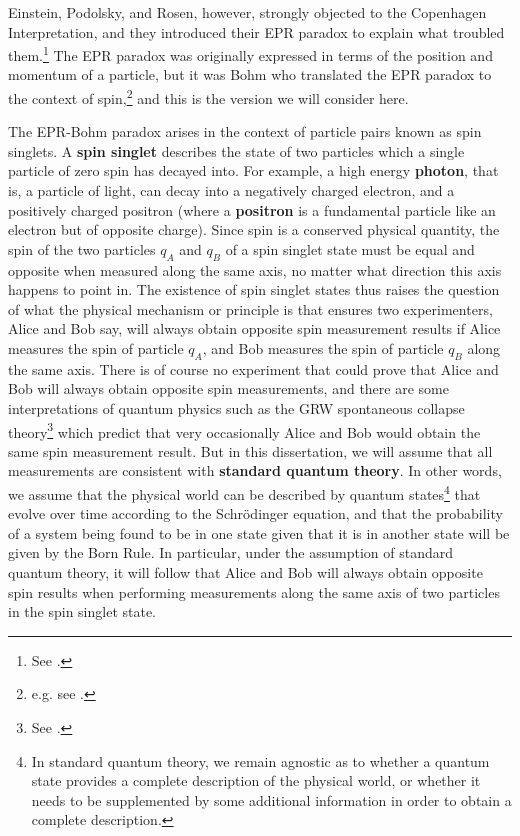 \documentclass[12pt]{report}
\begin{document}
Einstein, Podolsky, and Rosen, however, strongly objected to the Copenhagen Interpretation, and they introduced their EPR paradox to explain what troubled them.\footnote{See \cite{EinsteinPodolskyRosen}.} The EPR paradox was originally expressed in terms of the position and momentum of a particle, but it was Bohm who translated the EPR paradox to the context of spin,\footnote{e.g. see \cite[p. 29, Ch. 5 sec. 3, and Ch. 22 sec. 19]{BohmQuantumTheory}. } and this is the version we will consider here.   

The EPR-Bohm paradox arises in the context of particle pairs known as spin singlets. A \textbf{spin singlet} describes the state of two particles which a single particle of zero spin has decayed into. For example, a high energy \textbf{photon}, that is, a particle of light, can decay into a negatively charged electron, and a positively charged positron (where a \textbf{positron} is a fundamental particle like an electron but of opposite charge). Since spin is a conserved physical quantity, the spin of the two particles $q_A$ and $q_B$ %
%
of a spin singlet state must be equal and opposite when measured along the same axis, no matter what direction this axis happens to point in. The existence of spin singlet states thus raises the question of what the physical mechanism or principle is that ensures two experimenters, Alice and Bob say, will always obtain opposite spin measurement results if Alice measures the spin of particle $q_A$, and Bob measures the spin of particle $q_B$ along the same axis. There is of course no experiment that could prove that Alice and Bob will always obtain opposite spin measurements, and there are some interpretations of quantum physics such as the GRW spontaneous collapse theory\footnote{See \cite{sep-qm-collapse}.} which predict that very occasionally Alice and Bob would obtain the same spin measurement result. But in this dissertation, we will assume that all measurements are consistent with \textbf{standard quantum theory}. In other words, we assume that the physical world can be described by quantum states\footnote{In standard quantum theory, we remain agnostic as to whether a quantum state provides a complete description of the physical world, or whether it needs to be supplemented by some additional information in order to obtain a complete description.} that evolve over time according to the Schr\"{o}dinger equation, and that the probability of a system being found to be in one state given that it is in another state will be given by the Born Rule.  In particular, under the assumption of standard quantum theory, it will follow that Alice and Bob will always obtain opposite spin results when performing measurements along the same axis of two particles in the spin singlet state. 
\end{document}
